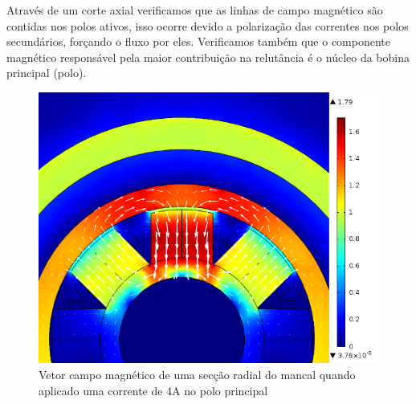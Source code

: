 Através de um corte axial verificamos que as linhas de campo magnético são contidas nos polos ativos, isso ocorre devido a polarização das correntes nos polos secundários, forçando o fluxo por eles. Verificamos também que o componente magnético responsável pela maior contribuição na relutância é o núcleo da bobina principal (polo).

\begin{figure}
\centering
\includegraphics[width=0.8\linewidth]{Figs/Simulacoes/Ativo/Cima_dx=03_I=4}
\caption{Vetor campo magnético de uma secção radial do mancal quando aplicado uma corrente de 4A no polo principal}
\label{fig:ativo:fem:b:radial}
\end{figure}



%


